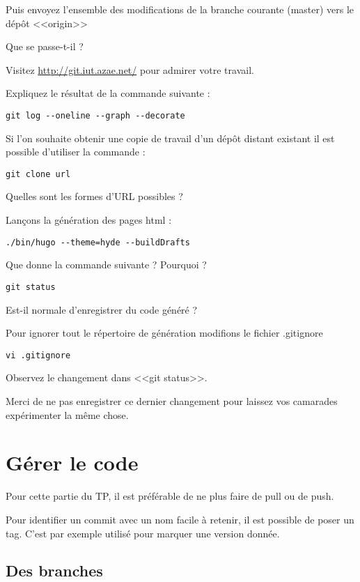 \documentclass[a4paper]{article}
\begin{document}
Puis envoyez l'ensemble des modifications de la branche courante (master) vers le dépôt <<origin>>

Que se passe-t-il ?

Visitez \url{http://git.iut.azae.net/} pour admirer votre travail.

Expliquez le résultat de la commande suivante : 
\begin{verbatim}
git log --oneline --graph --decorate
\end{verbatim}

Si l'on souhaite obtenir une copie de travail d'un dépôt distant existant il est possible d'utiliser la commande :
\begin{verbatim}
git clone url
\end{verbatim}

Quelles sont les formes d'URL possibles ?

Lançons la génération des pages html : 
\begin{verbatim}
./bin/hugo --theme=hyde --buildDrafts
\end{verbatim}

Que donne la commande suivante ? Pourquoi ? 
\begin{verbatim}
git status
\end{verbatim}

Est-il normale d'enregistrer du code généré ? 

Pour ignorer tout le répertoire de génération modifions le fichier .gitignore
\begin{verbatim}
vi .gitignore
\end{verbatim}

Observez le changement dans <<git status>>.

Merci de ne pas enregistrer ce dernier changement pour laissez vos camarades expérimenter la même chose.


\section{Gérer le code}

Pour cette partie du TP, il est préférable de ne plus faire de pull ou de push.

Pour identifier un commit avec un nom facile à retenir, il est possible de poser un tag. C'est par exemple utilisé pour marquer une version donnée.

\subsection{Des branches}
\end{document}
